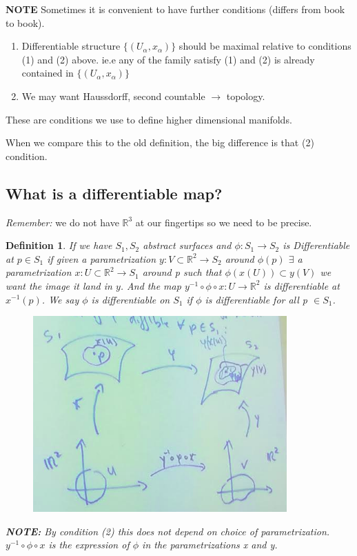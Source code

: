 \documentclass[a4paper, 11pt]{article}
\newtheorem*{definition}{Definition}
\begin{document}
	\textbf{NOTE} Sometimes it is convenient to have further conditions  (differs from book to book). 
		\begin{enumerate}
			\item Differentiable structure $\{(U_\alpha, x_\alpha)\}$ should be maximal relative to conditions (1) and (2) above. ie.e any of the family satisfy (1) and (2) is already contained in $\{(U_\alpha, x_\alpha)\}$
			\item We may want Haussdorff, second countable $\rightarrow$ topology.
		\end{enumerate}
	\noindent These are conditions we use to define higher dimensional manifolds. 
	
	
	When we compare this to the old definition, the big difference is that (2) condition. 
	
	
\subsection*{What is a differentiable map?} 
	\textit{Remember:} we do not have $\mathbb{R}^3$ at our fingertips so we need to be precise. \\ 
	
	\begin{definition}
		If we have $S_1, S_2$ abstract surfaces and $\phi:S_1\to S_2$ is \textit{Differentiable} at $p\in S_1$ if given a parametrization $y:V\subset\mathbb{R}^2\to S_2$ around $\phi(p)$ $\exists$ a parametrization $x:U\subset\mathbb{R}^2\to S_1$ around p such that $\phi(x(U))\subset y(V)$ we want the image it land in $y$. And the map $y^{-1}\circ \phi \circ x:U\to \mathbb{R}^2$ is differentiable at $x^{-1}(p)$. We say $\phi$ is differentiable on $S_1$ if $\phi$ is differentiable for all p $\in S_1$. 
			\begin{figure}[!hbt]
				\centering
				\includegraphics[width=0.65\columnwidth]{differentiable}
			\end{figure}
			
		\noindent\textbf{NOTE:} By condition (2) this does not depend on choice of parametrization. $y^{-1}\circ\phi\circ x$ is the expression of $\phi$ in the parametrizations x and y. 
	\end{definition}
	
\end{document}
